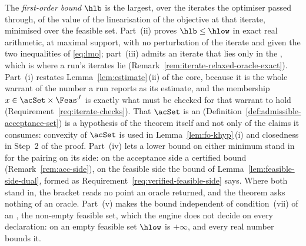 The \emph{first-order bound} $\hlb$ is the largest, over the iterates the
optimiser passed through, of the value of the linearisation of the
objective at that iterate, minimised over the feasible set. Part~(ii)
proves $\hlb\le\hlow$ in exact real arithmetic, at maximal support, with
no perturbation of the iterate and given the two inequalities of
\eqref{eq:lmo}; part~(iii) admits an iterate that lies only in
the , which is where a run's iterates lie
(Remark~\ref{rem:iterate-relaxed-oracle-exact}). Part~(i) restates
Lemma~\ref{lem:estimate}\,(ii) of the core, because it is the whole
warrant of the number a run reports as its estimate, and the membership
$x\in\acSet\times\Feas^{J}$ is exactly what must be checked for that
warrant to hold (Requirement~\ref{req:iterate-checks}). That $\acSet$ is an
 (Definition~\ref{def:admissible-acceptance-set}) is
a hypothesis of the theorem itself and not only of the claims it consumes:
convexity of $\acSet$ is used in Lemma~\ref{lem:fo-khyp}\,(i) and
closedness in Step~2 of the proof. Part~(iv) lets a lower bound on either
minimum stand in for the pairing on its side: on the acceptance side a
certified bound (Remark~\ref{rem:acc-side}), on the feasible side the bound
of Lemma~\ref{lem:feasible-side-dual}, formed as
Requirement~\ref{req:verified-feasible-side} says. Where both stand in, the
bracket reads no point an oracle returned, and the theorem asks nothing of
an oracle. Part~(v) makes the bound independent of
condition~(vii) of an , the non-empty feasible set,
which the engine does not decide on every declaration: on an empty feasible
set $\hlow$ is $+\infty$, and every real number bounds it.

